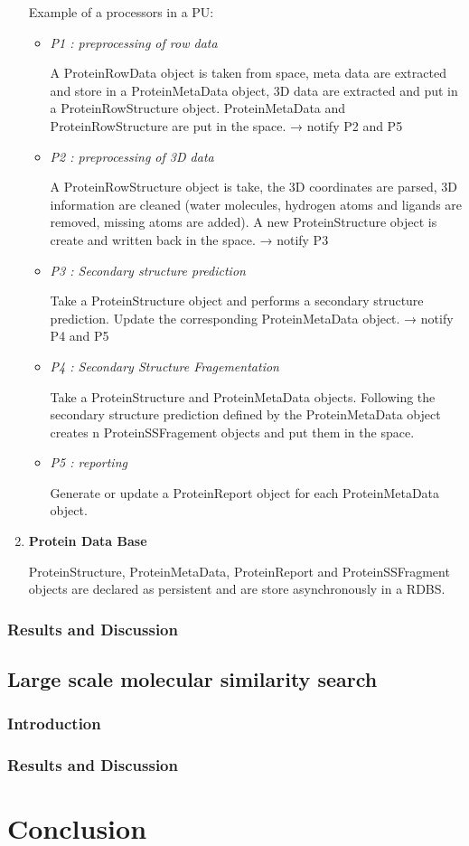\documentclass[a4paper,10pt]{article}
\begin{document}
\begin{enumerate}
Example of a processors in a PU:

\begin{itemize}
 \item \textit{P1 : preprocessing of row data}

A ProteinRowData object is taken from space, meta data are extracted and store in a  ProteinMetaData object, 3D data are extracted and put in a ProteinRowStructure object. ProteinMetaData and ProteinRowStructure are put in the space.
→ notify P2 and P5


\item \textit{P2 : preprocessing of 3D data}

A ProteinRowStructure object is take, the 3D coordinates are parsed, 3D information are cleaned (water molecules, hydrogen atoms and ligands are removed, missing atoms are added).  A new ProteinStructure object is create and written back in the space. 
→ notify P3

\item \textit{P3 : Secondary structure prediction}

Take a ProteinStructure object and performs a secondary structure prediction. Update the corresponding ProteinMetaData object.
→ notify P4 and P5

\item \textit{P4 : Secondary Structure Fragementation}

Take a ProteinStructure and ProteinMetaData objects. Following the secondary structure prediction defined by the ProteinMetaData object creates n ProteinSSFragement objects and put them in the space.

\item \textit{P5 : reporting}

Generate or update a ProteinReport object for each ProteinMetaData object.
\end{itemize}

\item \textbf{Protein Data Base}

ProteinStructure, ProteinMetaData, ProteinReport and ProteinSSFragment objects are declared as persistent and are store asynchronously in a RDBS.

\end{enumerate}

\subsubsection{Results and Discussion}



\subsection{Large scale molecular similarity search}
\subsubsection{Introduction}
\subsubsection{Results and Discussion}


\section{Conclusion}
\end{document}
